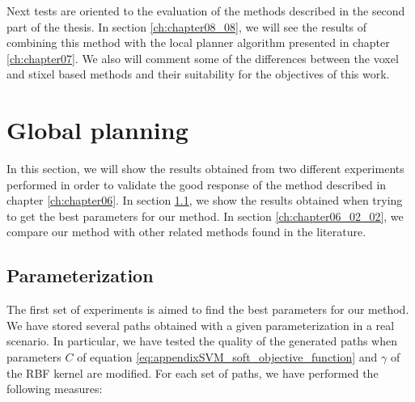 Next tests are oriented to the evaluation of the methods described in the second part of the thesis. In section \ref{ch:chapter08_08}, we will see the results of combining this method with the local planner algorithm presented in chapter \ref{ch:chapter07}. We also will comment some of the differences between the voxel and stixel based methods and their suitability for the objectives of this work.
 
\FloatBarrier
 
\graphicspath{{./images/chapter06/bmps/}{./images/chapter06/vects/}{./images/chapter06/}}
\section{Global planning}\label{ch:chapter06_02}

In this section, we will show the results obtained from two different experiments performed in order to validate the good response of the method described in chapter \ref{ch:chapter06}. In section \ref{ch:chapter06_02_01}, we show the results obtained when trying to get the best parameters for our method. In section \ref{ch:chapter06_02_02}, we compare our method with other related methods found in the literature.

\subsection{Parameterization}\label{ch:chapter06_02_01}

The first set of experiments is aimed to find the best parameters for our method. We have stored several paths obtained with a given parameterization in a real scenario. In particular, we have tested the quality of the generated paths when parameters $C$ of equation \ref{eq:appendixSVM_soft_objective_function} and $\gamma$ of the \ac{RBF} kernel are modified. For each set of paths, we have performed the following measures:

